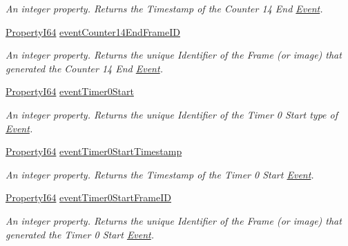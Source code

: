 \begin{DoxyCompactItemize}
\begin{DoxyCompactList}\small\item\em An integer property. Returns the Timestamp of the Counter 14 End \hyperlink{classmv_i_m_p_a_c_t_1_1acquire_1_1_event}{Event}. \end{DoxyCompactList}\item 
\hyperlink{group___common_interface_ga81749b2696755513663492664a18a893}{Property\+I64} \hyperlink{classmv_i_m_p_a_c_t_1_1acquire_1_1_gen_i_cam_1_1_event_control_aba01a0916add9fe22e00297825ca41aa}{event\+Counter14\+End\+Frame\+I\+D}
\begin{DoxyCompactList}\small\item\em An integer property. Returns the unique Identifier of the Frame (or image) that generated the Counter 14 End \hyperlink{classmv_i_m_p_a_c_t_1_1acquire_1_1_event}{Event}. \end{DoxyCompactList}\item 
\hyperlink{group___common_interface_ga81749b2696755513663492664a18a893}{Property\+I64} \hyperlink{classmv_i_m_p_a_c_t_1_1acquire_1_1_gen_i_cam_1_1_event_control_a7567a138d8154266146c43b9694c3b71}{event\+Timer0\+Start}
\begin{DoxyCompactList}\small\item\em An integer property. Returns the unique Identifier of the Timer 0 Start type of \hyperlink{classmv_i_m_p_a_c_t_1_1acquire_1_1_event}{Event}. \end{DoxyCompactList}\item 
\hyperlink{group___common_interface_ga81749b2696755513663492664a18a893}{Property\+I64} \hyperlink{classmv_i_m_p_a_c_t_1_1acquire_1_1_gen_i_cam_1_1_event_control_a8defe8a913269878fd3340dbfb4fa9c4}{event\+Timer0\+Start\+Timestamp}
\begin{DoxyCompactList}\small\item\em An integer property. Returns the Timestamp of the Timer 0 Start \hyperlink{classmv_i_m_p_a_c_t_1_1acquire_1_1_event}{Event}. \end{DoxyCompactList}\item 
\hyperlink{group___common_interface_ga81749b2696755513663492664a18a893}{Property\+I64} \hyperlink{classmv_i_m_p_a_c_t_1_1acquire_1_1_gen_i_cam_1_1_event_control_a29a2c994186a13f73c14eca7afbb29e7}{event\+Timer0\+Start\+Frame\+I\+D}
\begin{DoxyCompactList}\small\item\em An integer property. Returns the unique Identifier of the Frame (or image) that generated the Timer 0 Start \hyperlink{classmv_i_m_p_a_c_t_1_1acquire_1_1_event}{Event}. \end{DoxyCompactList}\item 

\end{DoxyCompactItemize}
